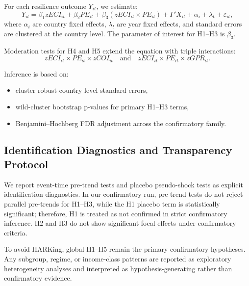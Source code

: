 For each resilience outcome $Y_{it}$, we estimate:
\[
Y_{it}=\beta_1 zECI_{it}+\beta_2 PE_{it}+\beta_3 (zECI_{it}\times PE_{it})+\Gamma'X_{it}+\alpha_i+\lambda_t+\varepsilon_{it},
\]
where $\alpha_i$ are country fixed effects, $\lambda_t$ are year fixed effects, and standard errors are clustered at the country level. The parameter of interest for H1--H3 is $\beta_3$.

Moderation tests for H4 and H5 extend the equation with triple interactions:
\[
zECI_{it}\times PE_{it}\times zCOI_{it}
\quad\text{and}\quad
zECI_{it}\times PE_{it}\times zGPR_{it}.
\]

Inference is based on:
\begin{itemize}
\item cluster-robust country-level standard errors,
\item wild-cluster bootstrap p-values for primary H1--H3 terms,
\item Benjamini--Hochberg FDR adjustment across the confirmatory family.
\end{itemize}

\subsection{Identification Diagnostics and Transparency Protocol}

We report event-time pre-trend tests and placebo pseudo-shock tests as explicit identification diagnostics. In our confirmatory run, pre-trend tests do not reject parallel pre-trends for H1--H3, while the H1 placebo term is statistically significant; therefore, H1 is treated as not confirmed in strict confirmatory inference. H2 and H3 do not show significant focal effects under confirmatory criteria.

To avoid HARKing, global H1--H5 remain the primary confirmatory hypotheses. Any subgroup, regime, or income-class patterns are reported as exploratory heterogeneity analyses and interpreted as hypothesis-generating rather than confirmatory evidence.
